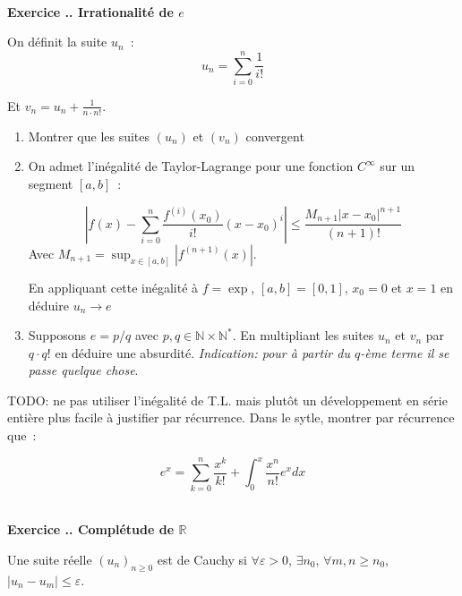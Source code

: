 \documentclass{article}
\newcommand{\mb}[1]{\mathbb{#1}}
\newcounter{exo}
\newcommand{\exercice}[1][\null]{\textbf{\\ Exercice \thesection.\theexo. #1} \addtocounter{exo}{1}}
\begin{document}
\exercice[Irrationalité de $e$]

On définit la suite $u_n$~:
\begin{equation*}
    u_n = \sum_{i = 0}^n \frac{1}{i !} 
\end{equation*}


Et $v_n = u_n + \frac{1}{n \cdot n!}$.

\begin{enumerate}
    \item Montrer que les suites $(u_n)$ et $(v_n)$ convergent 
    \item On admet l'inégalité de Taylor-Lagrange pour une 
        fonction $C^\infty$ sur un segment $[a,b]$~:

        \begin{equation*}
            \left|
            f(x) - \sum_{i = 0}^{n} \frac{f^{(i)} (x_0)}{i!} (x - x_0)^i 
            \right|
            \leq 
            \frac{M_{n+1} |x - x_0|^{n+1}}{(n+1)!}
        \end{equation*}
        Avec $M_{n+1} = \sup_{x \in [a,b] } |f^{(n+1)} (x)|$.

        En appliquant cette inégalité à $f = \exp$, $[a,b] = [0,1]$,
        $x_0 = 0$ et $x = 1$ 
        en déduire $u_n \to e$

    \item Supposons $e = p/q$ avec $p,q \in \mathbb{N} \times \mathbb{N}^*$.
        En multipliant les suites $u_n$ et $v_n$ par $q \cdot q!$ en déduire 
        une absurdité. \emph{Indication: pour à partir du $q$-ème terme il se
        passe quelque chose}.
\end{enumerate}

TODO: ne pas utiliser l'inégalité de T.L. mais plutôt 
un développement en série entière plus facile à justifier par récurrence. 
Dans le sytle, montrer par récurrence que~:

\begin{equation*}
    e^x = \sum_{k = 0}^n \frac{x^k}{k!} + \int_0^x \frac{x^n}{n!} e^x dx
\end{equation*}








\exercice[Complétude de $\mb{R}$]

Une suite réelle $(u_n)_{n \ge 0}$ est de Cauchy si $\forall \varepsilon >0$, $\exists n_0$, $\forall m,n \ge n_0$, $|u_n - u_m | \le \varepsilon$.
\end{document}
